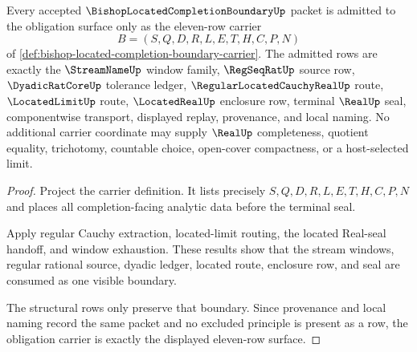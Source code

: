 \begin{theorem}
\label{thm:bishop-located-completion-boundary-obligation-carrier}
Every accepted $\BishopLocatedCompletionBoundaryUp$ packet is admitted to the obligation surface only as the eleven-row carrier
$$
B=(S,Q,D,R,L,E,T,H,C,P,N)
$$
of \autoref{def:bishop-located-completion-boundary-carrier}. The admitted rows are exactly the $\StreamNameUp$ window family, $\RegSeqRatUp$ source row, $\DyadicRatCoreUp$ tolerance ledger, $\RegularLocatedCauchyRealUp$ route, $\LocatedLimitUp$ route, $\LocatedRealUp$ enclosure row, terminal $\RealUp$ seal, componentwise transport, displayed replay, provenance, and local naming. No additional carrier coordinate may supply $\RealUp$ completeness, quotient equality, trichotomy, countable choice, open-cover compactness, or a host-selected limit.
\end{theorem}
\begin{proof}
Project the carrier definition. It lists precisely $S,Q,D,R,L,E,T,H,C,P,N$ and places all completion-facing analytic data before the terminal seal.

Apply regular Cauchy extraction, located-limit routing, the located Real-seal handoff, and window exhaustion. These results show that the stream windows, regular rational source, dyadic ledger, located route, enclosure row, and seal are consumed as one visible boundary.

The structural rows only preserve that boundary. Since provenance and local naming record the same packet and no excluded principle is present as a row, the obligation carrier is exactly the displayed eleven-row surface.
\end{proof}

